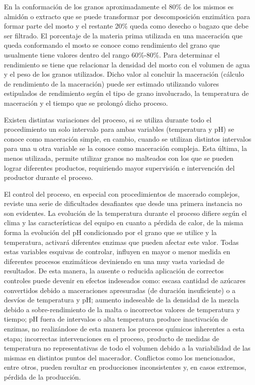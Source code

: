     \par
    En la conformación de los granos aproximadamente el 80\% de los mismos es almidón o extracto que se puede transformar por descomposición enzimática para formar parte del mosto y el restante 20\% queda como desecho o bagazo que debe ser filtrado. El porcentaje de la materia prima utilizada en una maceración que queda conformando el mosto se conoce como rendimiento del grano que usualmente tiene valores dentro del rango 60\%-80\%. Para determinar el rendimiento se tiene que relacionar la densidad del mosto con el volumen de agua y el peso de los granos utilizados. Dicho valor al concluir la maceración (cálculo de rendimiento de la maceración) puede ser estimado utilizando valores estipulados de rendimiento según el tipo de grano involucrado, la temperatura de maceración y el tiempo que se prolongó dicho proceso.
    \par
    Existen distintas variaciones del proceso, si se utiliza durante todo el procedimiento un solo intervalo para ambas variables (temperatura y pH) se conoce como maceración simple, en cambio, cuando se utilizan distintos intervalos para una u otra variable se la conoce como maceración compleja. Esta última, la menos utilizada, permite utilizar granos no malteados con los que se pueden lograr diferentes productos, requiriendo mayor supervisión e intervención del productor durante el proceso.
    \par
    El control del proceso, en especial con procedimientos de macerado complejos, reviste una serie de dificultades desafiantes que desde una primera instancia no son evidentes. La evolución de la temperatura durante el proceso difiere según el clima y las características del equipo en cuanto a pérdida de calor, de la misma forma la evolución del pH condicionado por el grano que se utilice y la temperatura, activará diferentes enzimas que pueden afectar este valor. Todas estas variables esquivas de controlar, influyen en mayor o menor medida en diferentes procesos enzimáticos deviniendo en una muy vasta variedad de resultados. De esta manera, la ausente o reducida aplicación de correctos controles puede devenir en efectos indeseados como: escasa cantidad de azúcares convertidos debido a maceraciones apresuradas (de duración insuficiente) o a desvíos de temperatura y pH; aumento indeseable de la densidad de la mezcla debido a sobre-rendimiento de la malta o incorrectos valores de temperatura y tiempo; pH fuera de intervalos o alta temperatura produce inactivación de enzimas, no realizándose de esta manera los procesos químicos inherentes a esta etapa; incorrectas intervenciones en el proceso, producto de medidas de temperatura no representativas de todo el volumen debido a la variabilidad de las mismas en distintos puntos del macerador. Conflictos como los mencionados, entre otros, pueden resultar en producciones inconsistentes y, en casos extremos, pérdida de la producción.
